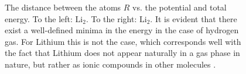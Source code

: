 \begin{figure}
 \begin{center}
  \caption{The distance between the atoms $R$ vs. the potential and total energy. To the left: $\mathrm{Li_2}$. To the right: $\mathrm{Li_2}$. It is evident that there exist a well-defined minima in the energy in the case of hydrogen gas. For Lithium this is not the case, which corresponds well with the fact that Lithium does not appear naturally in a gas phase in nature, but rather as ionic compounds in other molecules \cite{UniversityPhysics}.}
  \label{fig:molecules_R_vs_E}
 \end{center}
\end{figure}

